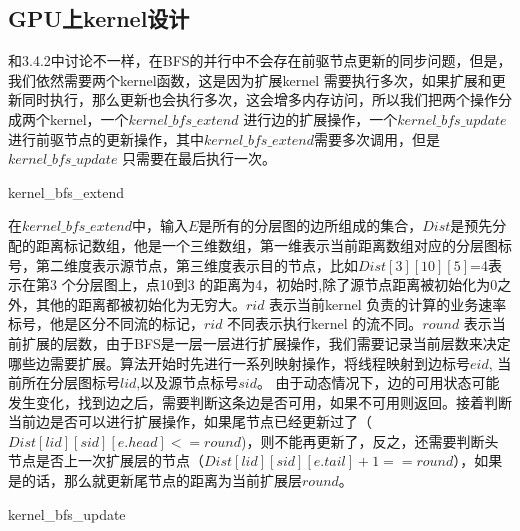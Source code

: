 \subsection{GPU上kernel设计}
和3.4.2中讨论不一样，在BFS的并行中不会存在前驱节点更新的同步问题，但是，我们依然需要两个kernel函数，这是因为扩展kernel 需要执行多次，如果扩展和更新同时执行，那么更新也会执行多次，这会增多内存访问，所以我们把两个操作分成两个kernel，一个$kernel\_bfs\_extend$ 进行边的扩展操作，一个$kernel\_bfs\_update$ 进行前驱节点的更新操作，其中$kernel\_bfs\_extend$需要多次调用，但是$kernel\_bfs\_update$ 只需要在最后执行一次。
\begin{algorithm}[t]
\begin{algorithmic}[1]
\EndIf
{}
\EndIf
\EndFunction
\end{algorithmic}
\caption{kernel\_bfs\_extend}
\label{KernelBFS}
\end{algorithm}
在$kernel\_bfs\_extend$中，输入$E$是所有的分层图的边所组成的集合，$Dist$是预先分配的距离标记数组，他是一个三维数组，第一维表示当前距离数组对应的分层图标号，第二维度表示源节点，第三维度表示目的节点，比如$Dist[3][10][5]$=4表示在第3 个分层图上，点10到3 的距离为4，初始时,除了源节点距离被初始化为0之外，其他的距离都被初始化为无穷大。$rid$ 表示当前kernel 负责的计算的业务速率标号，他是区分不同流的标记，$rid$ 不同表示执行kernel 的流不同。$round$ 表示当前扩展的层数，由于BFS是一层一层进行扩展操作，我们需要记录当前层数来决定哪些边需要扩展。算法开始时先进行一系列映射操作，将线程映射到边标号$eid$, 当前所在分层图标号$lid$,以及源节点标号$sid$。 由于动态情况下，边的可用状态可能发生变化，找到边之后，需要判断这条边是否可用，如果不可用则返回。接着判断当前边是否可以进行扩展操作，如果尾节点已经更新过了（$Dist[lid][sid][e.head]<=round$)，则不能再更新了，反之，还需要判断头节点是否上一次扩展层的节点（$Dist[lid][sid][e.tail]+1==round$），如果是的话，那么就更新尾节点的距离为当前扩展层$round$。
\begin{algorithm}[t]
\begin{algorithmic}[1]
\EndIf
{}
\EndIf
\EndFunction
\end{algorithmic}
\caption{kernel\_bfs\_update}
\label{KernelBFS}
\end{algorithm}
